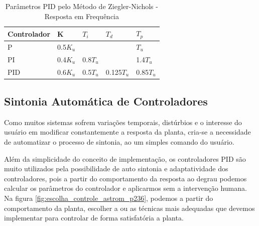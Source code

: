 \begin{table}
  \caption{Parâmetros PID pelo Método de Ziegler-Nichols - Resposta em Frequência}
  \label{tab:Ziegler-Nichols-freq}
  \centering%
  \begin{minipage}{.52\textwidth}
    \begin{tabular*}{\textwidth}{lllll}
      \hline
      {Controlador} & {K} & {$T_i$} & {$T_d$}& {$T_p$}\\ \hline
      \hline
      P    &  0.5$K_u$   &           &             & $T_u$  \\ 
      PI   &  0.4$K_u$   & 0.8$T_u$  &             & 1.4$T_u$ \\
      PID  &  0.6$K_u$   & 0.5$T_u$  & 0.125$T_u$  & 0.85$T_u$  \\ \hline
    \end{tabular*}
  \end{minipage}
\end{table}



\subsection{Sintonia Automática de Controladores}

Como muitos sistemas sofrem variações temporais, distúrbios e o interesse do usuário em modificar constantemente a resposta da planta, cria-se a necessidade de automatizar o processo de sintonia, ao um simples comando do usuário.

Além da simplicidade do conceito de implementação, os controladores PID são muito utilizados pela possibilidade de auto sintonia e adaptatividade dos controladores, pois a partir do comportamento da resposta ao degrau podemos calcular os parâmetros do controlador e aplicarmos sem a intervenção humana\cite{Astrom1995}. Na figura \ref{fig:escolha_controle_astrom_p236}, podemos a partir do comportamento da planta, escolher a ou as técnicas mais adequadas que devemos implementar para controlar de forma satisfatória a planta.

